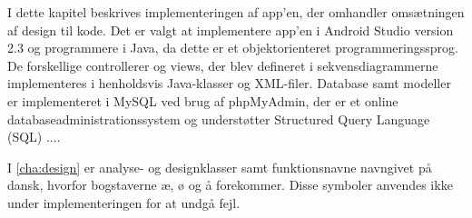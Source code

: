 I dette kapitel beskrives implementeringen af app'en, der omhandler omsætningen af design til kode. Det er valgt at implementere app'en i Android Studio version 2.3 og programmere i Java, da dette er et objektorienteret programmeringssprog. De forskellige controllerer og views, der blev defineret i sekvensdiagrammerne implementeres i henholdsvis Java-klasser og XML-filer. Database samt modeller er implementeret i MySQL ved brug af phpMyAdmin, der er et online databaseadministrationssystem og understøtter Structured Query Language (SQL) ....

I \autoref{cha:design} er analyse- og designklasser samt funktionsnavne navngivet på dansk, hvorfor bogstaverne æ, ø og å forekommer. Disse symboler anvendes ikke under implementeringen for at undgå fejl.